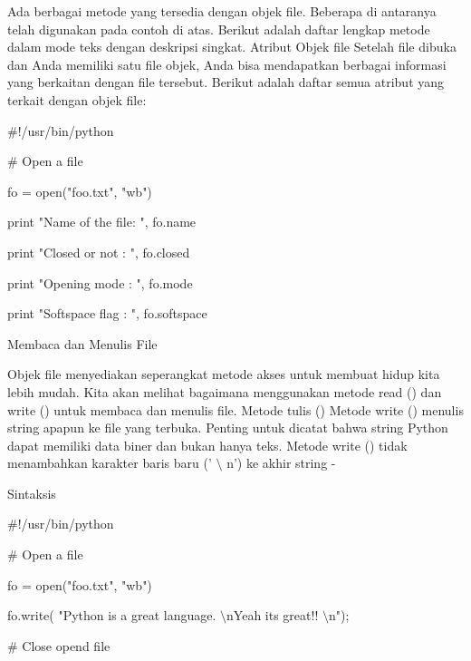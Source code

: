 Ada berbagai metode yang tersedia dengan objek file. Beberapa di antaranya telah digunakan pada contoh di atas. Berikut adalah daftar lengkap metode dalam mode teks dengan deskripsi singkat. Atribut Objek file Setelah file dibuka dan Anda memiliki satu file objek, Anda bisa mendapatkan berbagai informasi yang berkaitan dengan file tersebut. Berikut adalah daftar semua atribut yang terkait dengan objek file: \par
\vspace{12pt}
\vspace{12pt}
\vspace{12pt}
\noindent 
$  \#  $!/usr/bin/python \par
\vspace{12pt}
\noindent 
$  \#  $ Open a file \par
\noindent 
fo = open("foo.txt", "wb") \par
\noindent 
print "Name of the file: ", fo.name \par
\noindent 
print "Closed or not : ", fo.closed \par
\noindent 
print "Opening mode : ", fo.mode \par
\noindent 
print "Softspace flag : ", fo.softspace \par
\vspace{12pt}
\noindent 
Membaca dan Menulis File \par
\vspace{12pt}
Objek file menyediakan seperangkat metode akses untuk membuat hidup kita lebih mudah. Kita akan melihat bagaimana menggunakan metode read () dan write () untuk membaca dan menulis file. Metode tulis () Metode write () menulis string apapun ke file yang terbuka. Penting untuk dicatat bahwa string Python dapat memiliki data biner dan bukan hanya teks. Metode write () tidak menambahkan karakter baris baru (' $  \setminus  $ n') ke akhir string - \par
\noindent 
Sintaksis \par
\vspace{12pt}
\noindent 
$  \#  $!/usr/bin/python \par
\vspace{12pt}
\noindent 
$  \#  $ Open a file \par
\noindent 
fo = open("foo.txt", "wb") \par
\noindent 
fo.write( "Python is a great language. $  \setminus  $nYeah its great!! $  \setminus  $n"); \par
\vspace{12pt}
\noindent 
$  \#  $ Close opend file \par
